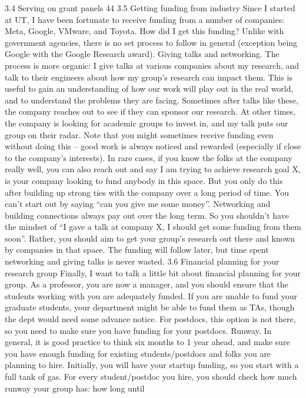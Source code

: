 \documentclass[oneside,11pt]{memoir}
\begin{document}
3.4 Serving on grant panels
44
3.5 Getting funding from industry
Since I started at UT, I have been fortunate to receive funding from a number of companies:
Meta, Google, VMware, and Toyota. How did I get this funding? Unlike with government
agencies, there is no set process to follow in general (exception being Google with the Google
Research award).
Giving talks and networking. The process is more organic: I give talks at various companies
about my research, and talk to their engineers about how my group’s research can impact them.
This is useful to gain an understanding of how our work will play out in the real world, and to
understand the problems they are facing.
Sometimes after talks like these, the company reaches out to see if they can sponsor our
research. At other times, the company is looking for academic groups to invest in, and my talk
puts our group on their radar. Note that you might sometimes receive funding even without
doing this – good work is always noticed and rewarded (especially if close to the company’s
interests).
In rare cases, if you know the folks at the company really well, you can also reach out and say I
am trying to achieve research goal X, is your company looking to fund anybody in this space.
But you only do this after building up strong ties with the company over a long period of time.
You can’t start out by saying “can you give me some money”.
Networking and building connections always pay out over the long term. So you shouldn’t have
the mindset of “I gave a talk at company X, I should get some funding from them soon”. Rather,
you should aim to get your group’s research out there and known by companies in that space.
The funding will follow later, but time spent networking and giving talks is never wasted.
3.6 Financial planning for your research group
Finally, I want to talk a little bit about financial planning for your group. As a professor, you are
now a manager, and you should ensure that the students working with you are adequately
funded. If you are unable to fund your graduate students, your department might be able to fund
them as TAs, though the dept would need some advance notice. For postdocs, this option is not
there, so you need to make sure you have funding for your postdocs.
Runway. In general, it is good practice to think six months to 1 year ahead, and make sure you
have enough funding for existing students/postdocs and folks you are planning to hire. Initially,
you will have your startup funding, so you start with a full tank of gas. For every
student/postdoc you hire, you should check how much runway your group has: how long until
\end{document}
